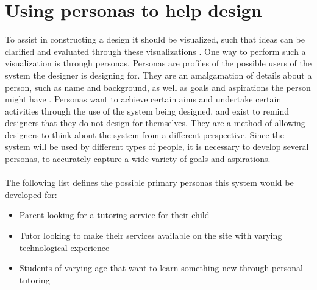 \section{Using personas to help design}
To assist in constructing a design it should be visualized, such that ideas can be clarified and evaluated through these visualizations \cite{DEB}.
One way to perform such a visualization is through personas.
Personas are profiles of the possible users of the system the designer is designing for.
They are an amalgamation of details about a person, such as name and background, as well as goals and aspirations the person might have \cite{DEB}.
Personas want to achieve certain aims and undertake certain activities through the use of the system being designed, and exist to remind designers that they do not design for themselves.
They are a method of allowing designers to think about the system from a different perspective.
Since the system will be used by different types of people, it is necessary to develop several personas, to accurately capture a wide variety of goals and aspirations.
\\\\
The following list defines the possible primary personas this system would be developed for:
\begin{itemize}
    \item Parent looking for a tutoring service for their child
    \item Tutor looking to make their services available on the site with varying technological experience
    \item Students of varying age that want to learn something new through personal tutoring
\end{itemize}

